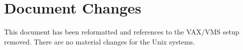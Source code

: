 \documentclass[twoside,11pt,nolof]{starlink}
\begin{document}
\section{Document Changes}
\label{changes}
This document has been reformatted and references to the VAX/VMS setup removed.
There are no material changes for the Unix systems.
\end{document}
